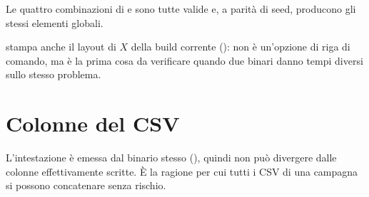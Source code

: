 Le quattro combinazioni di  e  sono tutte valide e,
a parit\`a di seed, producono gli stessi elementi globali.

 stampa anche il layout di $X$ della build corrente
(): non \`e un'opzione di riga di comando, ma \`e la
prima cosa da verificare quando due binari danno tempi diversi sullo stesso
problema.

\section{Colonne del CSV}

L'intestazione \`e emessa dal binario stesso (), quindi non pu\`o
divergere dalle colonne effettivamente scritte. \`E la ragione per cui tutti i CSV
di una campagna si possono concatenare senza rischio.

